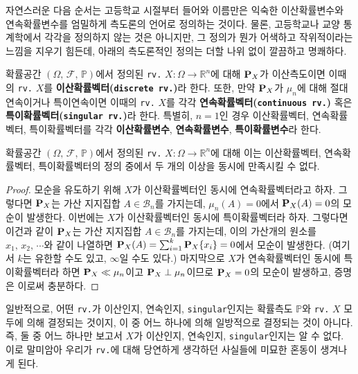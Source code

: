 자연스러운 다음 순서는 고등학교 시절부터 들어와 이름만은 익숙한 이산확률변수와 연속확률변수를 엄밀하게 측도론의 언어로 정의하는 것이다. 물론, 고등학교나 교양 통계학에서 각각을 정의하지 않는 것은 아니지만, 그 정의가 뭔가 어색하고 작위적이라는 느낌을 지우기 힘든데, 아래의 측도론적인 정의는 더할 나위 없이 깔끔하고 명쾌하다.

\begin{definition}
    확률공간 $(\Omega,\,\mathcal{F},\,\mathbb{P})$에서 정의된 \texttt{rv.} $X:\Omega\to\mathbb{R}^n$에 대해 $\mathbf{P}_X$가 이산측도이면 이때의 \texttt{rv.} $X$를 \textbf{이산확률벡터(\texttt{discrete rv.})}라 한다. 또한, 만약 $\mathbf{P}_X$가 $\mu_n$에 대해 절대연속이거나 특이연속이면 이때의 \texttt{rv.} $X$를 각각 \textbf{연속확률벡터(\texttt{continuous rv.})} 혹은 \textbf{특이확률벡터(\texttt{singular rv.})}라 한다. 특별히, $n=1$인 경우 이산확률벡터, 연속확률벡터, 특이확률벡터를 각각 \textbf{이산확률변수}, \textbf{연속확률변수}, \textbf{특이확률변수}라 한다.
\end{definition}

\begin{proposition}
    확률공간 $(\Omega,\,\mathcal{F},\,\mathbb{P})$에서 정의된 \texttt{rv.} $X:\Omega\to\mathbb{R}^n$에 대해 이는 이산확률벡터, 연속확률벡터, 특이확률벡터의 정의 중에서 두 개의 이상을 동시에 만족시킬 수 없다.
\end{proposition}

\begin{proof}
    모순을 유도하기 위해 $X$가 이산확률벡터인 동시에 연속확률벡터라고 하자. 그렇다면 $\mathbf{P}_X$는 가산 지지집합 $A\in\mathcal{B}_n$를 가지는데, $\mu_n(A)=0$에서 $\mathbf{P}_X(A)=0$의 모순이 발생한다. 이번에는 $X$가 이산확률벡터인 동시에 특이확률벡터라 하자. 그렇다면 이건과 같이 $\mathbf{P}_X$는 가산 지지집합 $A\in\mathcal{B}_n$를 가지는데, 이의 가산개의 원소를 $x_1,\,x_2,\,\cdots$와 같이 나열하면 $\mathbf{P}_X(A)=\sum_{i=1}^k\mathbf{P}_X\{x_i\}=0$에서 모순이 발생한다. (여기서 $k$는 유한할 수도 있고, $\infty$일 수도 있다.) 마지막으로 $X$가 연속확률벡터인 동시에 특이확률벡터라 하면 $\mathbf{P}_X\ll\mu_n$이고 $\mathbf{P}_X\perp\mu_n$이므로 $\mathbf{P}_X=0$의 모순이 발생하고, 증명은 이로써 충분하다.
\end{proof}

일반적으로, 어떤 \texttt{rv.}가 이산인지, 연속인지, \texttt{singular}인지는 확률측도 $\mathbb{P}$와 \texttt{rv.} $X$ 모두에 의해 결정되는 것이지, 이 중 어느 하나에 의해 일방적으로 결정되는 것이 아니다. 즉, 둘 중 어느 하나만 보고서 $X$가 이산인지, 연속인지, \texttt{singular}인지는 알 수 없다. 이로 말미암아 우리가 \texttt{rv.}에 대해 당연하게 생각하던 사실들에 미묘한 혼동이 생겨나게 된다.

